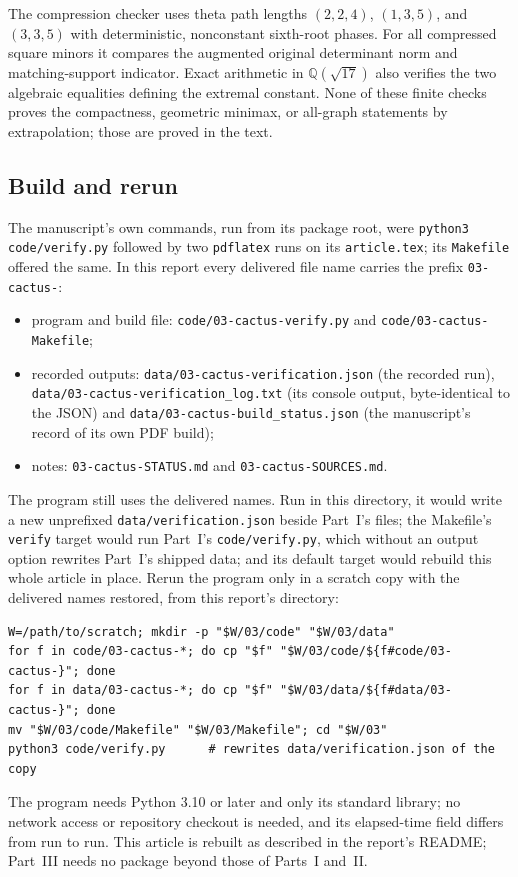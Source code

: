 \documentclass[11pt]{article}
\numberwithin{equation}{section}
\theoremstyle{definition}
\begin{document}
The compression checker uses theta path lengths $(2,2,4)$, $(1,3,5)$, and $(3,3,5)$ with deterministic, nonconstant sixth-root phases. For all compressed square minors it compares the augmented original determinant norm and matching-support indicator. Exact arithmetic in $\mathbb Q(\sqrt{17})$ also verifies the two algebraic equalities defining the extremal constant. None of these finite checks proves the compactness, geometric minimax, or all-graph statements by extrapolation; those are proved in the text.

\subsection{Build and rerun}
\label{cac:sec:build}
The manuscript's own commands, run from its package root, were
\texttt{python3 code/verify.py} followed by two \texttt{pdflatex} runs on
its \texttt{article.tex}; its \texttt{Makefile} offered the same. In this
report every delivered file name carries the prefix \texttt{03-cactus-}:
\begin{itemize}[leftmargin=1.4em,itemsep=0pt]\raggedright
\item program and build file: \nolinkurl{code/03-cactus-verify.py} and
 \nolinkurl{code/03-cactus-Makefile};
\item recorded outputs: \nolinkurl{data/03-cactus-verification.json} (the
 recorded run), \nolinkurl{data/03-cactus-verification_log.txt} (its console
 output, byte-identical to the JSON) and
 \nolinkurl{data/03-cactus-build_status.json} (the manuscript's record of its
 own PDF build);
\item notes: \nolinkurl{03-cactus-STATUS.md} and
 \nolinkurl{03-cactus-SOURCES.md}.
\end{itemize}
The program still uses the delivered names. Run in this directory, it would
write a new unprefixed \nolinkurl{data/verification.json} beside Part~I's
files; the Makefile's \texttt{verify} target would run Part~I's
\texttt{code/verify.py}, which without an output option rewrites Part~I's
shipped data; and its default target would rebuild this whole article in
place. Rerun the program only in a scratch copy with the delivered names
restored, from this report's directory:
\begin{lstlisting}
W=/path/to/scratch; mkdir -p "$W/03/code" "$W/03/data"
for f in code/03-cactus-*; do cp "$f" "$W/03/code/${f#code/03-cactus-}"; done
for f in data/03-cactus-*; do cp "$f" "$W/03/data/${f#data/03-cactus-}"; done
mv "$W/03/code/Makefile" "$W/03/Makefile"; cd "$W/03"
python3 code/verify.py      # rewrites data/verification.json of the copy
\end{lstlisting}
The program needs Python 3.10 or later and only its standard library; no
network access or repository checkout is needed, and its elapsed-time field
differs from run to run. This article is rebuilt as described in the
report's README; Part~III needs no package beyond those of Parts~I and~II.
\end{document}
